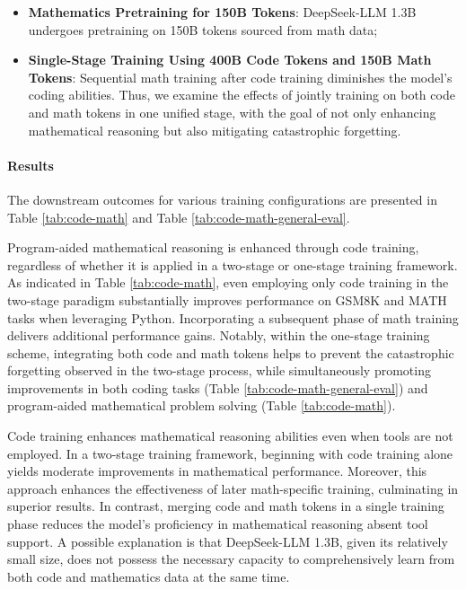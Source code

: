 \begin{itemize}[topsep=0pt]
\begin{itemize}[topsep=0pt]
\begin{itemize}[topsep=0pt]
    \item \textbf{Mathematics Pretraining for 150B Tokens}: DeepSeek-LLM 1.3B undergoes pretraining on 150B tokens sourced from math data;
    \item \textbf{Single-Stage Training Using 400B Code Tokens and 150B Math Tokens}: Sequential math training after code training diminishes the model's coding abilities. Thus, we examine the effects of jointly training on both code and math tokens in one unified stage, with the goal of not only enhancing mathematical reasoning but also mitigating catastrophic forgetting.
\end{itemize}

\paragraph{Results}
The downstream outcomes for various training configurations are presented in Table \ref{tab:code-math} and Table \ref{tab:code-math-general-eval}.

Program-aided mathematical reasoning is enhanced through code training, regardless of whether it is applied in a two-stage or one-stage training framework. As indicated in Table \ref{tab:code-math}, even employing only code training in the two-stage paradigm substantially improves performance on GSM8K and MATH tasks when leveraging Python. Incorporating a subsequent phase of math training delivers additional performance gains. Notably, within the one-stage training scheme, integrating both code and math tokens helps to prevent the catastrophic forgetting observed in the two-stage process, while simultaneously promoting improvements in both coding tasks (Table \ref{tab:code-math-general-eval}) and program-aided mathematical problem solving (Table \ref{tab:code-math}).

Code training enhances mathematical reasoning abilities even when tools are not employed. In a two-stage training framework, beginning with code training alone yields moderate improvements in mathematical performance. Moreover, this approach enhances the effectiveness of later math-specific training, culminating in superior results. In contrast, merging code and math tokens in a single training phase reduces the model's proficiency in mathematical reasoning absent tool support. A possible explanation is that DeepSeek-LLM 1.3B, given its relatively small size, does not possess the necessary capacity to comprehensively learn from both code and mathematics data at the same time.


\end{itemize}
\end{itemize}
